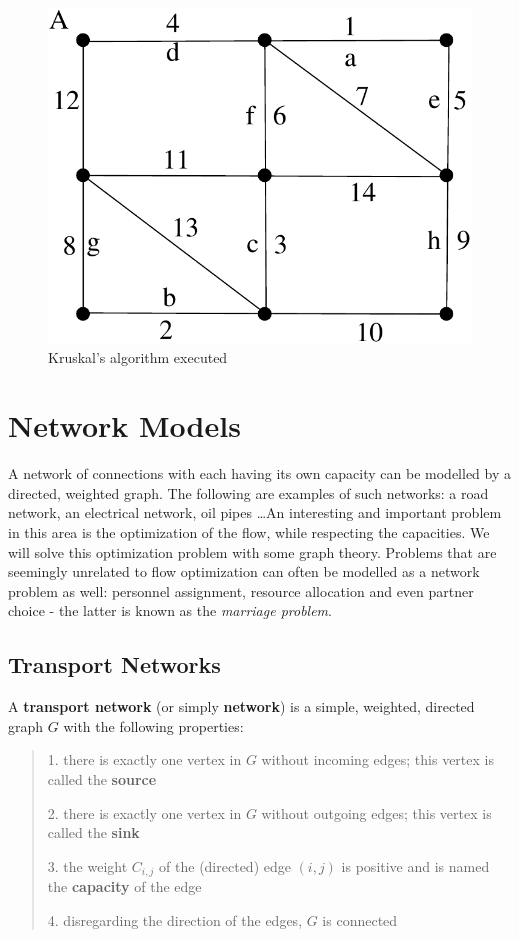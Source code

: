\begin{figure}[ht]
\begin{center}
\includegraphics[width=0.3\linewidth,keepaspectratio]{kruskal1} %
\end{center}
\caption{Kruskal's algorithm executed}\label{kruskal1}
\end{figure}


\chapter{Network Models}

A network of connections with each having its own capacity can be modelled by
a directed, weighted graph. The following are examples of such
networks: a road network, an electrical network, oil pipes \ldots An
interesting and important problem in this area is the optimization
of the flow, while respecting the capacities. We will solve this
optimization problem with some graph theory. Problems that are
seemingly unrelated to flow optimization can often be modelled as a
network problem as well: personnel assignment, resource allocation and
even partner choice - the latter is known as the {\em marriage
  problem}.


\section{Transport Networks}

 \begin{definition} {\rm A \textbf{transport
         network} (or simply \textbf{network}) is a simple, weighted,
       directed graph $G$ with the following properties:
\begin{verse}
1. there is exactly one vertex in $G$ without incoming edges; this
vertex is called the \textbf{source}

2. there is exactly one vertex in $G$ without outgoing edges; this
vertex is called the \textbf{sink}

3.
the weight $C_{i,j}$ of the (directed) edge $(i,j)$ is positive and is
named the \textbf{capacity} of the edge

4.
disregarding the direction of the edges, $G$ is connected
\end{verse}
}
\end{definition}




